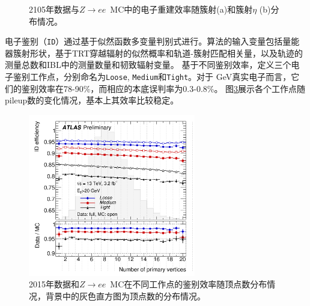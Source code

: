 \begin{figure}[h]
\begin{center}
\begin{subfigure}[b]{0.45\textwidth}
      \caption{}
      \label{fig:ele_reco_eta_eff}
  \end{subfigure}
\caption{2105年数据与$Z\rightarrow ee$~MC中的电子重建效率随簇射\et (a)和簇射$\eta$ (b)分布情况\cite{ATLAS-CONF-2016-024}。} 
 \label{fig:ele_reco_eff}
\end{center}
\end{figure}

电子鉴别（\texttt{ID}）通过基于似然函数多变量判别式\cite{ATLAS-CONF-2016-024}进行。算法的输入变量包括量能器簇射形状，基于TRT穿越辐射的似然概率和轨道-簇射匹配相关量，以及轨迹的测量总数和IBL中的测量数量和韧致辐射变量。
基于不同鉴别效率，定义三个电子鉴别工作点，分别命名为\texttt{Loose}, \texttt{Medium}和\texttt{Tight}。对于 GeV真实电子而言，它们的鉴别效率在78-90\%，而相应的本底误判率为0.3-0.8\%。
图\ref{fig:ele_id_eff_pileup}展示各个工作点随pileup数的变化情况，基本上其效率比较稳定。
\begin{figure}
\centering
\includegraphics[width=0.65\textwidth]{fig/ele_id_eff_pileup.png}
\caption{2015年数据和$Z\rightarrow ee$~MC在不同工作点的鉴别效率随顶点数分布情况\cite{ATLAS-CONF-2016-024}，背景中的灰色直方图为顶点数的分布情况。}
\label{fig:ele_id_eff_pileup}
\end{figure}

